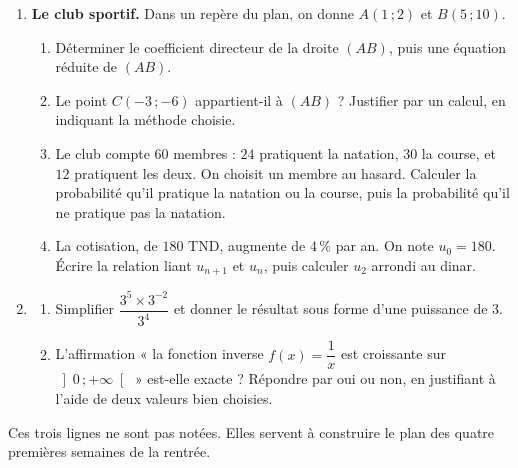\documentclass[10pt,a4paper]{article}
\begin{document}
\needspace{68mm}\par\vspace{3mm}
\begin{enumerate}
\needspace{22mm}
\item[\textbf{C1.}] \textbf{Le club sportif.} Dans un repère du plan, on donne $A(1\,;2)$ et $B(5\,;10)$.
\begin{enumerate}
\item Déterminer le coefficient directeur de la droite $(AB)$, puis une équation réduite de $(AB)$.
\item Le point $C(-3\,;-6)$ appartient-il à $(AB)$ ? Justifier par un calcul, en indiquant la méthode choisie.
\item Le club compte $60$ membres : $24$ pratiquent la natation, $30$ la course, et $12$ pratiquent les deux.
On choisit un membre au hasard. Calculer la probabilité qu'il pratique la natation ou la course,
puis la probabilité qu'il ne pratique pas la natation.
\item La cotisation, de $180$ TND, augmente de $4\,\%$ par an. On note $u_0 = 180$. Écrire la relation liant
$u_{n+1}$ et $u_n$, puis calculer $u_2$ arrondi au dinar.
\end{enumerate}
\par\vspace{1.2mm}
\needspace{22mm}
\item[\textbf{C2.}] \begin{enumerate}
\item Simplifier $\dfrac{3^{5}\times 3^{-2}}{3^{4}}$ et donner le résultat sous forme d'une puissance de $3$.
\item L'affirmation « la fonction inverse $f(x) = \dfrac{1}{x}$ est croissante sur $\left]0\,;+\infty\right[$ »
est-elle exacte ? Répondre par oui ou non, en justifiant à l'aide de deux valeurs bien choisies.
\end{enumerate}
\par\vspace{1.2mm}
\end{enumerate}
\brouillon{\dimexpr\textheight/3\relax}
\newpage
{}
\begin{methodbox}Ces trois lignes ne sont pas notées. Elles servent à construire le plan des quatre premières semaines de la rentrée.\end{methodbox}
\end{document}
